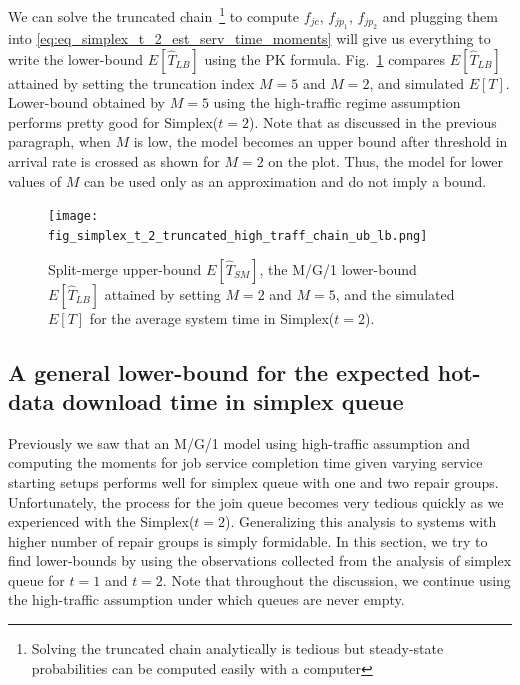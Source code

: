 \documentclass[sigconf,draft]{acmart}
\begin{document}
We can solve the truncated chain~\footnote{Solving the truncated chain analytically is tedious but steady-state probabilities can be computed easily with a computer} to compute $f_{jc}$, $f_{jp_1}$, $f_{jp_2}$ and plugging them into \eqref{eq:eq_simplex_t_2_est_serv_time_moments} will give us everything to write the lower-bound $E[\hat{T}_{LB}]$ using the PK formula. Fig.~\ref{fig:fig_simplex_t_2_truncated_high_traff_chain_ub_lb} compares $E[\hat{T}_{LB}]$ attained by setting the truncation index $M=5$ and $M=2$, and simulated $E[T]$. Lower-bound obtained by $M=5$ using the high-traffic regime assumption performs pretty good for Simplex($t=2$). Note that as discussed in the previous paragraph, when $M$ is low, the model becomes an upper bound after threshold in arrival rate is crossed as shown for $M=2$ on the plot. Thus, the model for lower values of $M$ can be used only as an approximation and do not imply a bound.
\begin{figure}[h]
  \centering
  \texttt{[image: fig\_simplex\_t\_2\_truncated\_high\_traff\_chain\_ub\_lb.png]}
  \caption{Split-merge upper-bound $E[\hat{T}_{SM}]$, the M/G/1 lower-bound $E[\hat{T}_{LB}]$ attained by setting $M=2$ and $M=5$, and the simulated $E[T]$ for the average system time in Simplex($t=2$).}
  \label{fig:fig_simplex_t_2_truncated_high_traff_chain_ub_lb}
\end{figure}

\subsection{A general lower-bound for the expected hot-data download time in simplex queue}
\label{subsec:subsec_simplex_t_lb_conjecture_renewals}
Previously we saw that an M/G/1 model using high-traffic assumption and computing the moments for job service completion time given varying service starting setups performs well for simplex queue with one and two repair groups. Unfortunately, the process for the join queue becomes very tedious quickly as we experienced with the Simplex($t=2$). Generalizing this analysis to systems with higher number of repair groups is simply formidable. In this section, we try to find lower-bounds by using the observations collected from the analysis of simplex queue for $t=1$ and $t=2$. Note that throughout the discussion, we continue using the high-traffic assumption under which queues are never empty.
\end{document}
